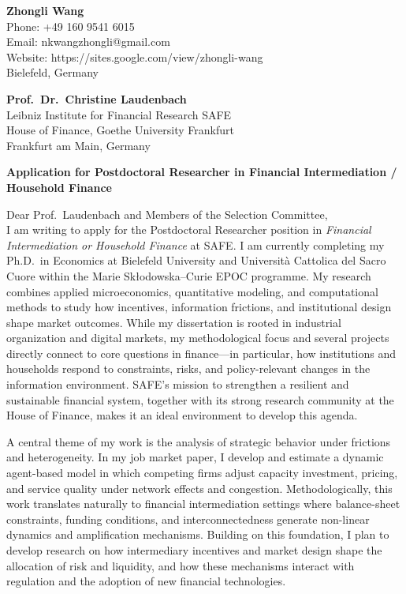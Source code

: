 \documentclass[11pt]{article}
\begin{document}
\noindent
\textbf{Zhongli Wang} \\
Phone: +49 160 9541 6015 \\
Email: nkwangzhongli@gmail.com \\
Website: https://sites.google.com/view/zhongli-wang \\
Bielefeld, Germany \\

\vspace{0.5cm}

\noindent
\textbf{Prof.\ Dr.\ Christine Laudenbach} \\
Leibniz Institute for Financial Research SAFE \\
House of Finance, Goethe University Frankfurt \\
Frankfurt am Main, Germany \\

\vspace{0.5cm}

\noindent
\textbf{Application for Postdoctoral Researcher in Financial Intermediation / Household Finance} \\

\vspace{0.3cm}

\noindent Dear Prof.\ Laudenbach and Members of the Selection Committee,\\[0.2cm]

I am writing to apply for the Postdoctoral Researcher position in \textit{Financial Intermediation or Household Finance} at SAFE. 
I am currently completing my Ph.D.\ in Economics at Bielefeld University and Università Cattolica del Sacro Cuore within the Marie Skłodowska--Curie EPOC programme. 
My research combines applied microeconomics, quantitative modeling, and computational methods to study how incentives, information frictions, and institutional design shape market outcomes. 
While my dissertation is rooted in industrial organization and digital markets, my methodological focus and several projects directly connect to core questions in finance---in particular, how institutions and households respond to constraints, risks, and policy-relevant changes in the information environment. 
SAFE's mission to strengthen a resilient and sustainable financial system, together with its strong research community at the House of Finance, makes it an ideal environment to develop this agenda.

A central theme of my work is the analysis of strategic behavior under frictions and heterogeneity. 
In my job market paper, I develop and estimate a dynamic agent-based model in which competing firms adjust capacity investment, pricing, and service quality under network effects and congestion. 
Methodologically, this work translates naturally to financial intermediation settings where balance-sheet constraints, funding conditions, and interconnectedness generate non-linear dynamics and amplification mechanisms. 
Building on this foundation, I plan to develop research on how intermediary incentives and market design shape the allocation of risk and liquidity, and how these mechanisms interact with regulation and the adoption of new financial technologies.
\end{document}
